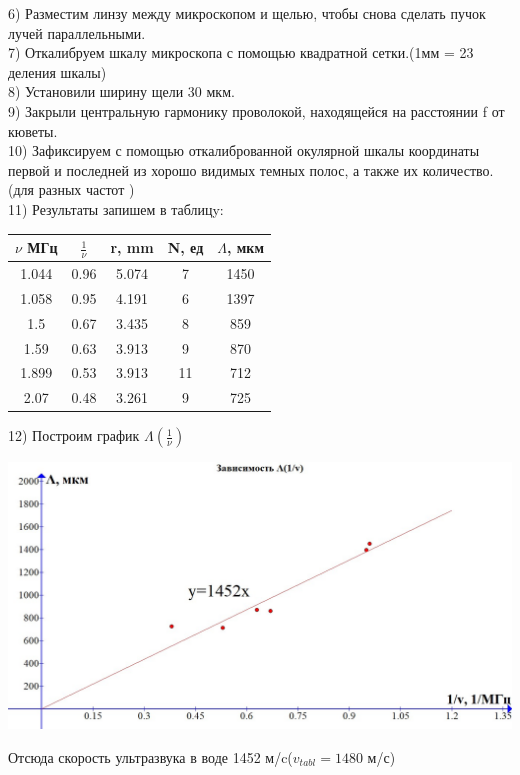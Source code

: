 \documentclass[a4paper,12pt]{article} %
\begin{document}
 6) Разместим линзу между микроскопом и щелью, чтобы снова сделать пучок лучей параллельными.\\
 7) Откалибруем шкалу микроскопа с помощью квадратной сетки.(1мм = 23 деления шкалы) \\
 8) Установили ширину щели 30 мкм. \\
 9) Закрыли центральную гармонику проволокой, находящейся на расстоянии f от кюветы.\\
 10) Зафиксируем с помощью откалиброванной окулярной шкалы координаты первой и последней из хорошо видимых темных полос, а также их количество.(для разных частот )\\
 11) Результаты запишем в таблицy: \\
 \begin{center}
 
 \begin{tabular}{|c|c|c|c|c|}
 \hline 
 $\nu$ МГц & $\frac{1}{\nu}$ & r, mm & N, ед & $\Lambda$, мкм \\ 
 \hline 
 1.044 &0.96 &5.074 & 7 & 1450 \\ 
 \hline 
 1.058 & 0.95&4.191 & 6 & 1397 \\ 
 \hline 
 1.5 &0.67 &3.435 & 8 & 859 \\ 
 \hline 
 1.59 & 0.63&3.913 & 9 & 870 \\ 
 \hline 
 1.899 & 0.53&3.913 & 11 & 712 \\ 
 \hline 
 2.07 &0.48 &3.261 & 9 & 725 \\ 
 \hline 
 \end{tabular} 
 \end{center}

12) Построим график $\Lambda(\frac{1}{\nu})$\\
\begin{center}
\includegraphics[scale=0.34]{25}
\end{center}
Отсюда скорость ультразвука в воде 1452 м/c($v_{tabl}=1480$ м/с)
\end{document}
